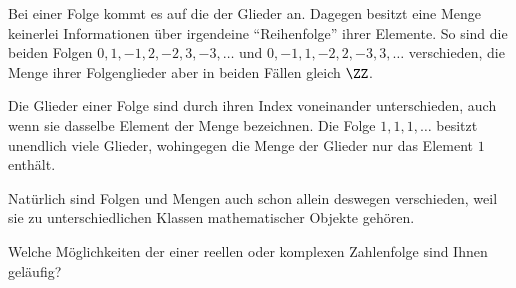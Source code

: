 \begin{antwort}
  Bei einer Folge kommt es auf die  der Glieder an.
  Dagegen besitzt eine Menge keinerlei Informationen über irgendeine 
  "`Reihenfolge"' ihrer Elemente. 
  So sind die beiden Folgen $0,1,-1,2,-2,3,-3,\ldots$ und 
  $0,-1,1,-2,2,-3,3,\ldots$ verschieden, die Menge ihrer Folgenglieder 
  aber in beiden Fällen gleich $\ZZ$.

  Die Glieder einer Folge sind durch ihren Index voneinander unterschieden, 
  auch wenn sie dasselbe Element der Menge bezeichnen. Die Folge $1,1,1,\ldots$ 
  besitzt unendlich viele Glieder, wohingegen die Menge der Glieder nur 
  das Element $1$ enthält. 

  Natürlich sind Folgen und Mengen auch schon allein deswegen 
  verschieden, weil sie zu unterschiedlichen Klassen mathematischer 
  Objekte gehören. \AntEnd
\end{antwort}

\begin{frage}%
  \label{02_fvis}
  Welche Möglichkeiten der  einer reellen oder 
  komplexen Zahlenfolge sind Ihnen geläufig?
\end{frage}

